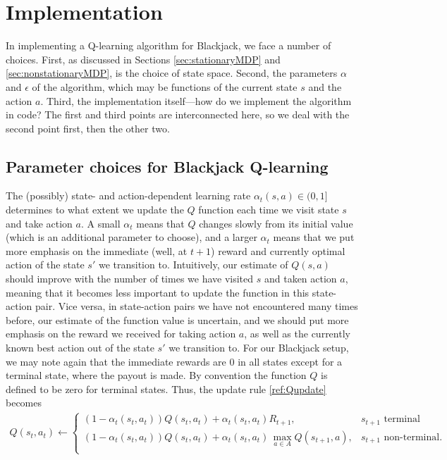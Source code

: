 \section{Implementation} \label{sec:implementation}
In implementing a Q-learning algorithm for Blackjack, we face a number of choices.
First, as discussed in Sections \ref{sec:stationaryMDP} and \ref{sec:nonstationaryMDP}, is the choice of state space.
Second, the parameters $\alpha$ and $\epsilon$ of the algorithm, which may be functions of the current state $s$ and
the action $a$. Third, the implementation itself---how do we implement the algorithm in code? The first and third points
are interconnected here, so we deal with the second point first, then the other two.

\subsection{Parameter choices for Blackjack Q-learning} \label{sec:paramchoices}
The (possibly) state- and action-dependent learning rate $\alpha_t(s, a) \in (0, 1]$ determines to what extent we update 
the $Q$ function each time we visit state $s$ and take action $a$. A small $\alpha_t$ means that $Q$ changes slowly
from its initial value (which is an additional parameter to choose), and a larger $\alpha_t$ means that we put more
emphasis on the immediate (well, at $t+1$) reward and currently optimal action of the state $s'$ we transition to.
%
Intuitively, our estimate of $Q(s,a)$ should improve with the number of times we have visited $s$ and taken action $a$,
meaning that it becomes less important to update the function in this state-action pair. Vice versa, in state-action pairs
we have not encountered many times before, our estimate of the function value is uncertain, and we should put more emphasis
on the reward we received for taking action $a$, as well as the currently known best action out of the state $s'$ we transition to.
For our Blackjack setup, we may note again that the immediate rewards are 0 in all states except for a terminal state, where the payout is made. 
By convention the function $Q$ is defined to be zero for terminal states. Thus, the update rule \eqref{ref:Qupdate} becomes
\begin{align} \label{eq:bjQupdate}
          Q(s_t,a_t)  \leftarrow 
          \begin{cases}
            (1-\alpha_t(s_t,a_t))Q(s_t,a_t) + \alpha_t(s_t,a_t) R_{t+1}, &s_{t+1} \text{ terminal} \\
            (1-\alpha_t(s_t,a_t))Q(s_t,a_t) + \alpha_t(s_t,a_t) \, \underset{a \in A}{\max} Q(s_{t+1},a), &s_{t+1} \text{ non-terminal}. \\
          \end{cases}
\end{align}

